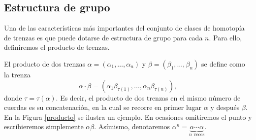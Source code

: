 \documentclass[TFG.tex]{subfiles}
\begin{document}
\subsection{Estructura de grupo}
Una de las características más importantes del conjunto de clases de homotopía de trenzas es que puede dotarse de estructura de grupo para cada $n$. Para ello, definiremos el producto de trenzas. 

\begin{defi}
El producto de dos trenzas $\alpha=(\alpha_1,\dots, \alpha_n)$ y $\beta=(\beta_1,\dots,\beta_n)$ se define como la trenza
$$\alpha\cdot\beta = (\alpha_1\beta_{\tau(1)},\dots, \alpha_n\beta_{\tau(n)}),$$
donde $\tau=\tau(\alpha)$. Es decir, el producto de dos trenzas en el mismo número de cuerdas es su concatenación, en la cual se recorre en primer lugar $\alpha$ y después $\beta$. En la Figura \ref{producto} se ilustra un ejemplo. En ocasiones omitiremos el punto y escribieremos simplemente $\alpha\beta$. Asímismo, denotaremos $\alpha^n=\underbrace{\alpha\cdots\alpha}_{n\text{ veces}}$.
\end{defi}
\end{document}
